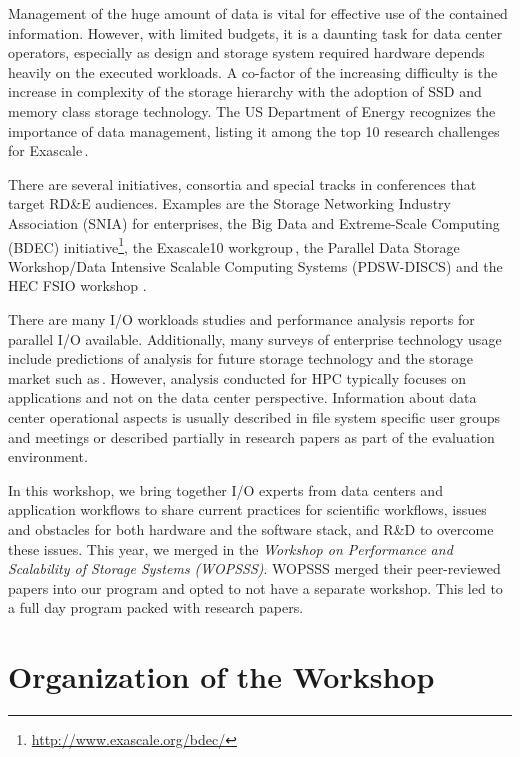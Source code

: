 \documentclass{llncs}
\begin{document}
Management of the huge amount of data is vital for effective use of the contained information. However, with limited budgets, it is a daunting task for data center operators,
especially as design and storage system required hardware depends heavily on the executed workloads.
A co-factor of the increasing difficulty is the increase in complexity of the storage hierarchy with the adoption of SSD and memory class storage technology.
The US Department of Energy recognizes the importance of data management, listing it among the top 10 research challenges for Exascale\,\cite{top14}. %

There are several initiatives, consortia and special tracks in conferences that target RD\&E audiences.
Examples are the Storage Networking Industry Association (SNIA) for enterprises, the
Big Data and Extreme-Scale Computing (BDEC) initiative\footnote{\url{http://www.exascale.org/bdec/}}, the
Exascale10 workgroup\,\cite{brinkmann14}, the Parallel Data Storage Workshop/Data Intensive Scalable Computing Systems
(PDSW-DISCS) and the HEC FSIO workshop \cite{bancroft2009}.

There are many I/O workloads studies and performance analysis reports for parallel I/O available.
Additionally, many surveys of enterprise technology usage include predictions of analysis for future storage technology and the storage market such as\,\cite{idc1}.
However, analysis conducted for HPC typically focuses on applications and not on the data center perspective.
Information about data center operational aspects is usually described in file system specific user groups and meetings or described partially in research papers as part of the evaluation environment.

In this workshop, we bring together I/O experts from data centers and application workflows to share current practices for scientific workflows, issues and obstacles for both hardware and the software stack, and R\&D to overcome these issues.
This year, we merged in the \textit{Workshop on Performance and Scalability of Storage Systems (WOPSSS)}. WOPSSS merged their peer-reviewed papers into our program and opted to not have a separate workshop. This led to a full day program packed with research papers.


\section{Organization of the Workshop}
\end{document}
